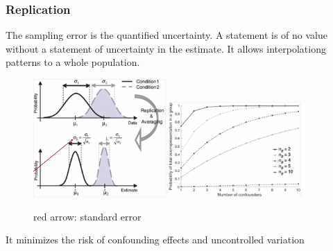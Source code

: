\documentclass{article}
\begin{document}
\subsubsection{Replication}
The sampling error is the quantified uncertainty. A statement is of no value without a statement of uncertainty in the estimate. It allows interpolationg patterns to a whole population.
\begin{figure}[h]
\centering
\includegraphics[width = 0.45\textwidth]{exp-design/replication.png}
\includegraphics[width = 0.45\textwidth]{exp-design/replication2.png}
\caption{red arrow: standard error}
\end{figure}
It minimizes the risk of confounding effects and uncontrolled variation
\end{document}
